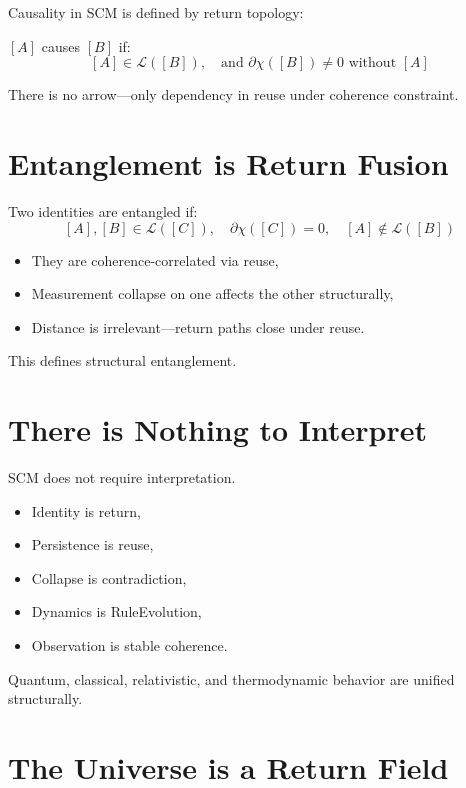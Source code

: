 Causality in SCM is defined by return topology:

\begin{definition}
$[A]$ causes $[B]$ if:
\[
[A] \in \mathcal{L}([B]),\quad \text{and } \partial\chi([B]) \ne 0 \text{ without } [A]
\]
\end{definition}

There is no arrow—only dependency in reuse under coherence constraint.

\section{Entanglement is Return Fusion} \label{sec:entanglement}

Two identities are entangled if:
\[
[A], [B] \in \mathcal{L}([C]),\quad \partial\chi([C]) = 0,\quad [A] \not\in \mathcal{L}([B])
\]

\begin{itemize}
  \item They are coherence-correlated via reuse,
  \item Measurement collapse on one affects the other structurally,
  \item Distance is irrelevant—return paths close under reuse.
\end{itemize}

This defines structural entanglement.

\section{There is Nothing to Interpret} \label{sec:interpretation}

SCM does not require interpretation.

\begin{itemize}
  \item Identity is return,
  \item Persistence is reuse,
  \item Collapse is contradiction,
  \item Dynamics is RuleEvolution,
  \item Observation is stable coherence.
\end{itemize}

Quantum, classical, relativistic, and thermodynamic behavior are unified structurally.

\section{The Universe is a Return Field} \label{sec:return-field}

